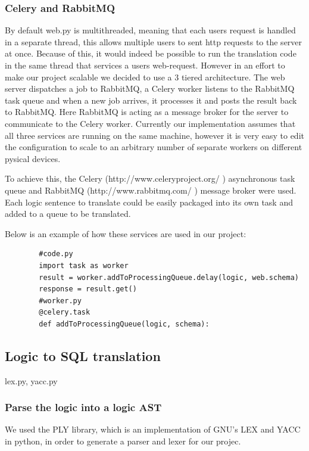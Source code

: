 \documentclass[a4paper, 11pt]{article}
\begin{document}
    \subsubsection{Celery and RabbitMQ}
      By default web.py is multithreaded, meaning that each users request is
      handled in a separate thread, this allows multiple users to sent http
      requests to the server at once. Because of this, it would indeed be
      possible to run the translation code in the same thread that services 
      a users web-request. However in an effort to make our project scalable we
      decided to use a 3 tiered architecture. The web server dispatches a job to
      RabbitMQ, a Celery worker listens to the RabbitMQ task queue and when a
      new job arrives, it processes it and posts the result back to RabbitMQ.
      Here RabbitMQ is acting as a message broker for the server to communicate
      to the Celery worker. Currently our implementation assumes that all three
      services are running on the same machine, however it is very easy to edit
      the configuration to scale to an arbitrary number of separate workers on
      different pysical devices.

      



      To achieve this, the Celery (http://www.celeryproject.org/ ) asynchronous
      task queue and RabbitMQ (http://www.rabbitmq.com/ ) message broker were
      used. Each logic sentence to translate could be easily packaged into its
      own task and added to a queue to be translated.

      Below is an example of how these services are used in our project: 
      \begin{verbatim}
        #code.py
        import task as worker
        result = worker.addToProcessingQueue.delay(logic, web.schema)
        response = result.get()
        #worker.py
        @celery.task
        def addToProcessingQueue(logic, schema):
      \end{verbatim}



    \subsection{Logic to SQL translation}
    lex.py, yacc.py

    \subsubsection{Parse the logic into a logic AST}
      We used the PLY library, which is an implementation of GNU's LEX and YACC
      in python, in order to generate a parser and lexer for our projec.
\end{document}
